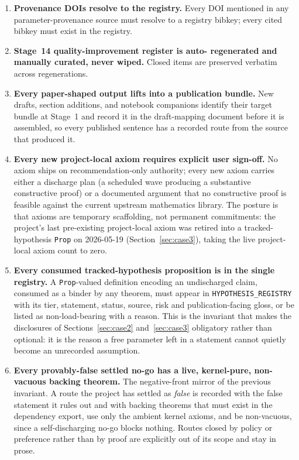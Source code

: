 \documentclass[11pt]{article}
\begin{document}
\begin{enumerate}
\item \textbf{Provenance DOIs resolve to the registry.} Every DOI
mentioned in any parameter-provenance source must resolve to a
registry bibkey; every cited bibkey must exist in the registry.

\item \textbf{Stage~14 quality-improvement register is auto-
regenerated and manually curated, never wiped.} Closed items
are preserved verbatim across regenerations.

\item \textbf{Every paper-shaped output lifts into a publication
bundle.} New drafts, section additions, and notebook companions
identify their target bundle at Stage~1 and record it in the
draft-mapping document before it is assembled, so every published
sentence has a recorded route from the source that produced it.

\item \textbf{Every new project-local axiom requires explicit
user sign-off.} No axiom ships on
recommendation-only authority; every new axiom carries either a
discharge plan (a scheduled wave producing a substantive
constructive proof) or a documented argument that no constructive
proof is feasible against the current upstream mathematics
library. The posture is that axioms are temporary scaffolding,
not permanent commitments: the project's last pre-existing
project-local axiom was retired into a tracked-hypothesis
\texttt{Prop} on 2026-05-19 (Section~\ref{sec:case3}), taking the
live project-local axiom count to zero.

\item \textbf{Every consumed tracked-hypothesis proposition is in the
single registry.} A \texttt{Prop}-valued definition encoding an
undischarged claim, consumed as a binder by any theorem, must appear
in \texttt{HYPOTHESIS\_REGISTRY} with its tier, statement, status,
source, risk and publication-facing gloss, or be listed as
non-load-bearing with a reason. This is the invariant that makes the
disclosures of Sections~\ref{sec:case2} and~\ref{sec:case3} obligatory
rather than optional: it is the reason a free parameter left in a
statement cannot quietly become an unrecorded assumption.

\item \textbf{Every provably-false settled no-go has a live,
kernel-pure, non-vacuous backing theorem.} The negative-front mirror
of the previous invariant. A route the project has settled as
\emph{false} is recorded with the false statement it rules out and
with backing theorems that must exist in the dependency export, use
only the ambient kernel axioms, and be non-vacuous, since a
self-discharging no-go blocks nothing. Routes closed by policy or
preference rather than by proof are explicitly out of its scope and
stay in prose.

\end{enumerate}
\end{document}

